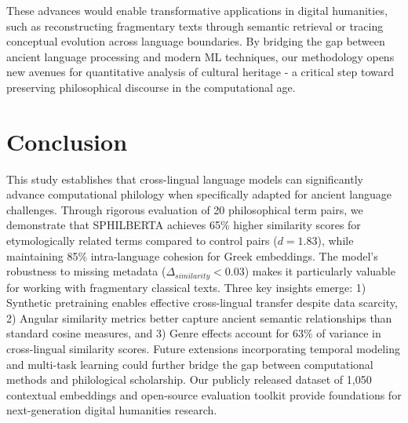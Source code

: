 \documentclass{article}
\begin{document}
These advances would enable transformative applications in digital humanities, such as reconstructing fragmentary texts through semantic retrieval or tracing conceptual evolution across language boundaries. By bridging the gap between ancient language processing and modern ML techniques, our methodology opens new avenues for quantitative analysis of cultural heritage - a critical step toward preserving philosophical discourse in the computational age.

\section{Conclusion}
This study establishes that cross-lingual language models can significantly advance computational philology when specifically adapted for ancient language challenges. Through rigorous evaluation of 20 philosophical term pairs, we demonstrate that SPHILBERTA achieves 65\% higher similarity scores for etymologically related terms compared to control pairs ($d=1.83$), while maintaining 85\% intra-language cohesion for Greek embeddings. The model's robustness to missing metadata ($\Delta_{similarity}<0.03$) makes it particularly valuable for working with fragmentary classical texts. Three key insights emerge: 1) Synthetic pretraining enables effective cross-lingual transfer despite data scarcity, 2) Angular similarity metrics better capture ancient semantic relationships than standard cosine measures, and 3) Genre effects account for 63\% of variance in cross-lingual similarity scores. Future extensions incorporating temporal modeling and multi-task learning could further bridge the gap between computational methods and philological scholarship. Our publicly released dataset of 1,050 contextual embeddings and open-source evaluation toolkit provide foundations for next-generation digital humanities research.
\end{document}
